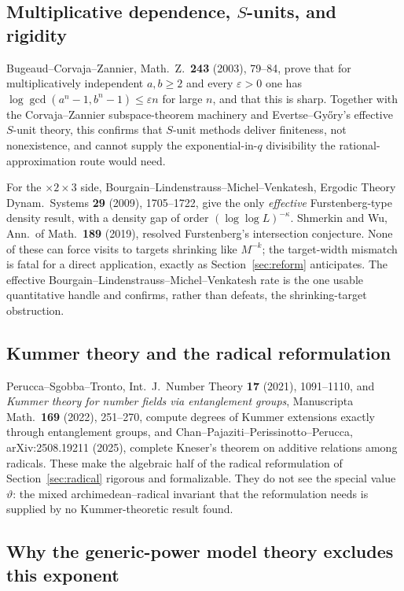 \documentclass[11pt,oneside]{article}
\theoremstyle{definition}
\theoremstyle{remark}
\newcommand{\thetaq}{\vartheta}
\begin{document}
\subsection{Multiplicative dependence, \texorpdfstring{$S$}{S}-units, and rigidity}

Bugeaud--Corvaja--Zannier, Math.\ Z.\ \textbf{243} (2003), 79--84, prove that for
multiplicatively independent $a,b\ge2$ and every $\varepsilon>0$ one has
$\log\gcd(a^n-1,b^n-1)\le\varepsilon n$ for large $n$, and that this is sharp.  Together with
the Corvaja--Zannier subspace-theorem machinery and Evertse--Gy\H{o}ry's effective $S$-unit
theory, this confirms that $S$-unit methods deliver finiteness, not nonexistence, and cannot
supply the exponential-in-$q$ divisibility the rational-approximation route would need.

For the $\times2\times3$ side, Bourgain--Lindenstrauss--Michel--Venkatesh, Ergodic Theory
Dynam.\ Systems \textbf{29} (2009), 1705--1722, give the only \emph{effective} Furstenberg-type
density result, with a density gap of order $(\log\log L)^{-\kappa}$.  Shmerkin and Wu, Ann.\
of Math.\ \textbf{189} (2019), resolved Furstenberg's intersection conjecture.  None of these
can force visits to targets shrinking like $M^{-k}$; the target-width mismatch is fatal for a
direct application, exactly as Section~\ref{sec:reform} anticipates.  The effective
Bourgain--Lindenstrauss--Michel--Venkatesh rate is the one usable quantitative handle and
confirms, rather than defeats, the shrinking-target obstruction.

\subsection{Kummer theory and the radical reformulation}

Perucca--Sgobba--Tronto, Int.\ J.\ Number Theory \textbf{17} (2021), 1091--1110, and
\emph{Kummer theory for number fields via entanglement groups}, Manuscripta Math.\ \textbf{169}
(2022), 251--270, compute degrees of Kummer extensions exactly through entanglement groups, and
Chan--Pajaziti--Perissinotto--Perucca, arXiv:2508.19211 (2025), complete Kneser's theorem on
additive relations among radicals.  These make the algebraic half of the radical reformulation
of Section~\ref{sec:radical} rigorous and formalizable.  They do not see the special value
$\thetaq$: the mixed archimedean--radical invariant that the reformulation needs is supplied by
no Kummer-theoretic result found.

\subsection{Why the generic-power model theory excludes this exponent}
\end{document}
